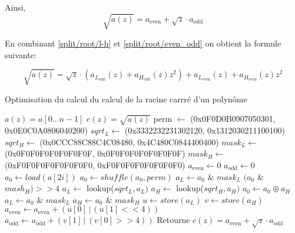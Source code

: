 \documentclass[12pt]{article}
\begin{document}
Ainsi,
\begin{equation}
\label{split/root/even_odd}
     \sqrt{a(z)} = a_{\text{even}} + \sqrt{z} \cdot a_{\text{odd}}
\end{equation}


En combinant \eqref{split/root/l-h} et \eqref{split/root/even_odd} on obtient la formule suivante:

\begin{equation*}
    \sqrt{a(z)} = \sqrt{z} \cdot (a_{L_{\text{odd}}}(z) + a_{H_{\text{odd}}}(z) z^2) + a_{L_{\text{even}}}(z) + a_{H_{\text{even}}}(z) z^2
\end{equation*}


\begin{algorithm}
\caption{Optimisation du calcul du calcul de la racine carrré d'un polynôme}
\begin{algorithmic}
\REQUIRE $a(z)=a[0\ldots n-1]$
\ENSURE $c(z) = \sqrt{a(z)}$
\STATE perm $\leftarrow$ (0x0F0D0B0907050301, 0x0E0C0A0806040200)
\STATE $sqrt_L\leftarrow$ (0x3332232231302120, 0x1312030211100100)
\STATE $sqrt_H \leftarrow$ (0x0CCC88C88C4C08480, 0x4C480C0844400400)
\STATE $mask_L \leftarrow$ (0x0F0F0F0F0F0F0F0F, 0x0F0F0F0F0F0F0F0F)
\STATE $mask_H \leftarrow$ (0xF0F0F0F0F0F0F0F0, 0xF0F0F0F0F0F0F0F0)
\STATE $a_{\text{even}} \leftarrow 0$
\STATE $a_{\text{odd}} \leftarrow 0$
\STATE $a_0 \leftarrow load(a[2i])$
\STATE $a_0 \leftarrow shuffle(a_0, perm)$
\STATE $a_L \leftarrow a_0$ \& $mask_L$
\STATE $(a_0$ \& $mash_H) >> 4$
\STATE $a_L \leftarrow$ lookup($sqrt_L, a_L)$
\STATE $a_H \leftarrow$ lookup($sqrt_H, a_H)$
\STATE $a_0 \leftarrow a_0 \oplus a_H$
\STATE $a_L \leftarrow a_0$ \& $mask_L$
\STATE $a_H \leftarrow a_0$ \& $mask_H$
\STATE $ u \leftarrow store(a_L)$
\STATE $ v \leftarrow store(a_H)$
\STATE $a_{\text{even}} \leftarrow a_{\text{even}} + (u[0] \, | \, (u[1] << 4 )) $
\STATE $a_{\text{odd}} \leftarrow a_{\text{odd}} + (v[1] \, | \, (v[0] >> 4 )) $
\ENDFOR
\STATE Retourne $c(z) =a_{\text{even}} + \sqrt{z} \cdot a_{\text{odd}} $
\end{algorithmic}
\end{algorithm}



\newpage
%
%
\end{document}
